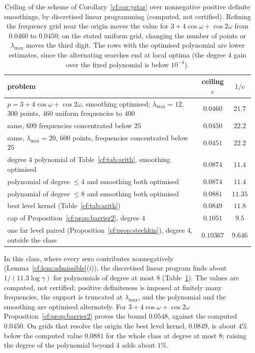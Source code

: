 \begin{table}[h]
\centering
\small\setlength{\tabcolsep}{4pt}\begin{tabular}{p{3.1in}cc}
\toprule
problem & ceiling $c$ & $1/c$\\
\midrule
$p=3+4\cos\omega+\cos2\omega$, smoothing optimised; $\lambda_{\max}=12$, $300$ points, $460$ uniform frequencies to $400$ & $0.0460$ & $21.7$\\
same, $699$ frequencies concentrated below $25$ & $0.0450$ & $22.2$\\
same, $\lambda_{\max}=20$, $600$ points, frequencies concentrated below $25$ & $0.0451$ & $22.2$\\
degree $4$ polynomial of Table~\ref{cf:tab:arith}, smoothing optimised & $0.0874$ & $11.4$\\
polynomial of degree $\le4$ and smoothing both optimised & $0.0874$ & $11.4$\\
polynomial of degree $\le8$ and smoothing both optimised & $0.0881$ & $11.35$\\
\midrule
best level kernel (Table~\ref{cf:tab:arith}) & $0.0849$ & $11.8$\\
cap of Proposition~\ref{cf:prop:barrier2}, degree $4$ & $0.1051$ & $9.5$\\
\midrule
one far level paired (Proposition~\ref{cf:prop:stechkin}), degree $4$, outside the class & $0.10367$ & $9.646$\\
\bottomrule
\end{tabular}
\caption{Ceiling of the scheme of Corollary~\ref{cf:cor:ystar} over nonnegative positive definite smoothings, by discretised linear programming (computed, not certified). Refining the frequency grid near the origin moves the value for $3+4\cos\omega+\cos2\omega$ from $0.0460$ to $0.0450$; on the stated uniform grid, changing the number of points or $\lambda_{\max}$ moves the third digit. The rows with the optimised polynomial are lower estimates, since the alternating searches end at local optima (the degree $4$ gain over the fixed polynomial is below $10^{-4}$).}
\label{cf:tab:lp}
\end{table}

In this class, where every zero contributes nonnegatively (Lemma~\ref{cf:lem:admissible}(i)), the discretised linear program finds about $1/(11.3\log\gamma)$ for polynomials of degree at most $8$ (Table~\ref{cf:tab:lp}). The values are computed, not certified: positive definiteness is imposed at finitely many frequencies, the support is truncated at $\lambda_{\max}$, and the polynomial and the smoothing are optimised alternately. For $3+4\cos\omega+\cos2\omega$ Proposition~\ref{cf:prop:barrier2} proves the bound $0.0548$, against the computed $0.0450$. On grids that resolve the origin the best level kernel, $0.0849$, is about $4\%$ below the computed value $0.0881$ for the whole class at degree at most $8$; raising the degree of the polynomial beyond $4$ adds about $1\%$.

